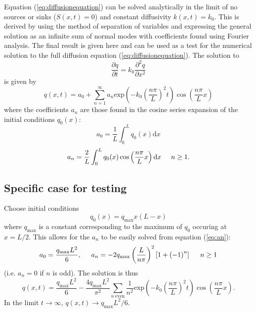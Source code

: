 \documentclass[12pt]{article}
\begin{document}
Equation (\ref{eq:diffusionequation}) can be solved analytically in the limit of no sources or sinks ($S(x,t)=0$) and constant diffusivity $k(x,t)=k_0$. This is derived by using the method of separation of variables and expressing the general solution as an infinite sum of normal modes with coefficients found using Fourier analysis. The final result is given here and can be used as a test for the numerical solution to the full diffusion equation (\ref{eq:diffusionequation}). The solution to
\begin{equation}\label{eq:simplifieddiffusionequation}
\frac{\partial q}{\partial t} = k_0\frac{\partial^2q}{\partial x^2}
\end{equation}
is given by
\begin{equation}\label{eq:analyticsolution}
q(x,t) = a_0 + \sum_{n=1}^\infty a_n \mathrm{exp}\left(-k_0\left(\frac{n\pi}{L}\right)^2t\right)\cos\left(\frac{n\pi}{L}x\right)
\end{equation}
where the coefficients $a_n$ are those found in the cosine series expansion of the initial conditions $q_0(x)$:
\begin{equation}\label{eq:a0}
a_0 = \frac{1}{L}\int_0^Lq_0(x)\mathrm{d}x
\end{equation}
\begin{equation}\label{eq:an}
a_n = \frac{2}{L}\int_0^Lq_0(x)\cos\left(\frac{n\pi}{L}x\right)\mathrm{d}x\hspace{5mm} n\geq 1.
\end{equation}

\subsection{Specific case for testing}
Choose initial conditions
\begin{equation}\label{eq:initialconditionsexample}
q_0(x) = q_\mathrm{max}x(L-x)
\end{equation}
where $q_\mathrm{max}$ is a constant corresponding to the maximum of $q_0$ occuring at $x=L/2$. This allows for the $a_n$ to be easily solved from equation (\ref{eq:an}):
\begin{equation}
a_0 = \frac{q_\mathrm{max}L^2}{6},\hspace{5mm} a_n = -2q_\mathrm{max}\left(\frac{L}{n\pi}\right)^2\left[1+\left(-1\right)^n\right]\hspace{5mm} n \geq 1
\end{equation}
(i.e. $a_n=0$ if $n$ is odd). The solution is thus
\begin{equation}\label{eq:specificanalyticsolution}
q(x,t) = \frac{q_\mathrm{max}L^2}{6} -\frac{4q_\mathrm{max}L^2}{\pi^2}\sum_{n\ \mathrm{even}}\frac{1}{n^2}\mathrm{exp}\left(-k_0\left(\frac{n\pi}{L}\right)^2t\right)\cos\left(\frac{n\pi}{L}x\right).
\end{equation}
In the limit $t\rightarrow\infty$, $q(x,t)\rightarrow q_\mathrm{max}L^2/6$.
\end{document}

